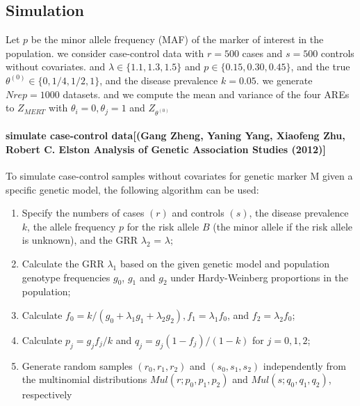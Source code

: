 \documentclass{article}
\begin{document}
\subsection{Simulation}
Let $p$ be the minor allele frequency (MAF) of the marker of interest in the population. we consider case-control data with $r=500$ cases and $s= 500$ controls without covariates. and $\lambda \in \{1.1, 1.3, 1.5\}$ and $p \in \{0.15,0.30, 0.45 \}$, and the true $\theta^{(0)} \in \{0,1/4,1/2,1\}$, and the disease prevalence $k=0.05$. we generate $Nrep=1000$ datasets. and we compute the mean and variance of the four AREs to  $Z_{MERT}$ with $\theta_i=0, \theta_j=1$ and $Z_{\theta^{(0)}}$

\paragraph{simulate case-control data[(Gang Zheng, Yaning Yang, Xiaofeng Zhu, Robert C. Elston Analysis of Genetic Association Studies (2012)]}

To simulate case-control samples without covariates for genetic marker M given a
specific genetic model, the following algorithm can be used:
\begin{enumerate}
  \item Specify the numbers of cases $(r)$ and controls $(s)$, the disease prevalence $k$, the
allele frequency $p$ for the risk allele $B$ (the minor allele if the risk allele is unknown),
and the GRR $\lambda_2$ = $\lambda$;
  \item Calculate the GRR $\lambda_1$ based on the given genetic model and population genotype
frequencies $g_0$, $g_1$ and $g_2$ under Hardy-Weinberg proportions in the population;
  \item Calculate $f_0 = k/(g_0 +\lambda_1g_1 + \lambda_2g_2), f_1 = \lambda_1f_0$, and $f_2 = \lambda_2f_0$;
  \item Calculate $p_j = g_jf_j/k$ and $q_j = g_j(1- f_j)/(1-k)$ for $j = 0, 1, 2$;
  \item Generate random samples $(r_0, r_1, r_2)$ and $(s_0, s_1, s_2)$ independently from the multinomial distributions $Mul(r;p_0,p_1,p_2)$ and $Mul(s; q_0, q_1, q_2)$, respectively
\end{enumerate}
\end{document}
